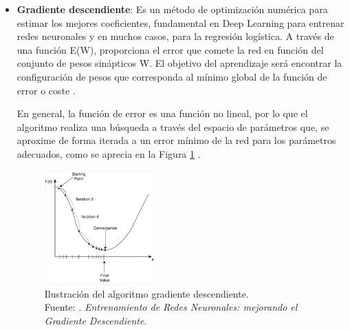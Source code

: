 \begin{itemize}
\begin{itemize}
\begin{itemize}
			Donde:
			\begin{conditions}
				h_{\theta}(x_{i})	&	función sigmoide de $\theta^T x$ \\
				\theta	&	vector de longitud theta para j=0,1,2,3...n \\
				x   &  matriz de entradas \\
				y	&  vector de salidas
			\end{conditions}
			
			La primera parte de la ecuación está conformada por el logaritmo de la probabilidad de éxito y la segunda, por la de fracaso.
			
			\item \textbf{Gradiente descendiente}: Es un método de optimización numérica para estimar los mejores coeficientes, fundamental en Deep Learning para entrenar redes neuronales y en muchos casos, para la regresión logística. A través de una función E(W), proporciona el error que comete la red en función del conjunto de pesos sinápticos W. El objetivo del aprendizaje será encontrar la configuración de pesos que corresponda al mínimo global de la función de error o coste \parencite{tec_bertona2005algevol}.
			
			En general, la función de error es una función no lineal, por lo que el algoritmo realiza una búsqueda a través del espacio de parámetros que, se aproxime de forma iterada a un error mínimo de la red para los parámetros adecuados, como se aprecia en la Figura \ref{2:fig15} \parencite{tec_sancho2017descentgrad}.
			\begin{figure}[h]
				\begin{center}
					\includegraphics[width=0.40\textwidth]{2/figures/gradiente_descendiente.jpg}
					\caption[Ilustración del algoritmo gradiente descendiente]{Ilustración del algoritmo gradiente descendiente.\\
					Fuente: \cite{tec_sancho2017descentgrad}. \textit{Entrenamiento de Redes Neuronales: mejorando el Gradiente Descendiente}.}
					\label{2:fig15}
				\end{center}
			\end{figure}
			

\end{itemize}
\end{itemize}
\end{itemize}
